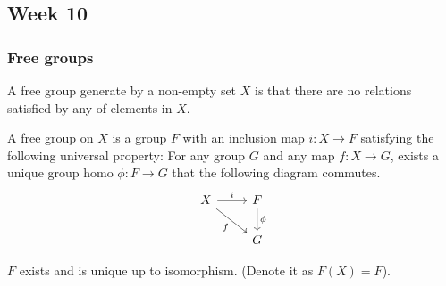 \subsection{Week 10}
\subsubsection{Free groups}
A free group generate by a non-empty set $X$ is that
there are no relations satisfied by any of elements in $X$.

\begin{definition}
  A free group on $X$ is a group $F$ with an inclusion map $i: X \to F$ satisfying the
  following universal property: For any group $G$ and any map $f: X \to G$,
  exists a unique group homo $\phi : F \to G$ that the following diagram commutes.
  \[
    \begin{tikzcd}
    X \arrow{r}{i} \arrow[swap]{dr}{f} & F \arrow{d}{\phi} \\
    & G
    \end{tikzcd}
  \]
\end{definition}

\begin{theorem}
  $F$ exists and is unique up to isomorphism. (Denote it as $F(X) = F$).
\end{theorem}

